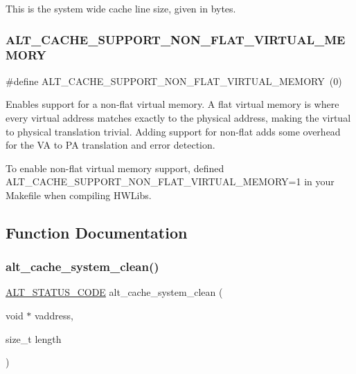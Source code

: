 This is the system wide cache line size, given in bytes. \mbox{\label{group__CACHE__SYS_ga6f5aef1f8665ce92140f797a40107362}} 
\subsubsection{\texorpdfstring{ALT\_CACHE\_SUPPORT\_NON\_FLAT\_VIRTUAL\_MEMORY}{ALT\_CACHE\_SUPPORT\_NON\_FLAT\_VIRTUAL\_MEMORY}}
{\footnotesize\ttfamily \#define A\+L\+T\+\_\+\+C\+A\+C\+H\+E\+\_\+\+S\+U\+P\+P\+O\+R\+T\+\_\+\+N\+O\+N\+\_\+\+F\+L\+A\+T\+\_\+\+V\+I\+R\+T\+U\+A\+L\+\_\+\+M\+E\+M\+O\+RY~(0)}

Enables support for a non-\/flat virtual memory. A flat virtual memory is where every virtual address matches exactly to the physical address, making the virtual to physical translation trivial. Adding support for non-\/flat adds some overhead for the VA to PA translation and error detection.

To enable non-\/flat virtual memory support, defined A\+L\+T\+\_\+\+C\+A\+C\+H\+E\+\_\+\+S\+U\+P\+P\+O\+R\+T\+\_\+\+N\+O\+N\+\_\+\+F\+L\+A\+T\+\_\+\+V\+I\+R\+T\+U\+A\+L\+\_\+\+M\+E\+M\+O\+RY=1 in your Makefile when compiling H\+W\+Libs. 

\subsection{Function Documentation}
\mbox{\label{group__CACHE__SYS_gad6f5aeeac2c752c650e9faa1c7df0e97}} 
\subsubsection{\texorpdfstring{alt\_cache\_system\_clean()}{alt\_cache\_system\_clean()}}
{\footnotesize\ttfamily \mbox{\hyperlink{hwlib_8h_abdb0d369f069723ca55d6c94bcaaaa12}{A\+L\+T\+\_\+\+S\+T\+A\+T\+U\+S\+\_\+\+C\+O\+DE}} alt\+\_\+cache\+\_\+system\+\_\+clean (\begin{DoxyParamCaption}\item[{void $\ast$}]{vaddress,  }\item[{size\+\_\+t}]{length }\end{DoxyParamCaption})}

